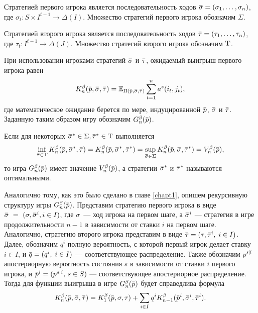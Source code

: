 {Стратегией первого игрока является последовательность ходов $\sigmav = (\sigma_1, \ldots, \sigma_n)$, где $\sigma_t: S \times I^{t-1} \rightarrow \Delta(I)$.
Множество стратегий первого игрока обозначим $\Sigma$.

Стратегией второго игрока является последовательность ходов $\tauv = (\tau_1, \ldots, \tau_n)$, где $\tau_t: I^{t-1} \rightarrow \Delta(J)$.
Множество стратегий второго игрока обозначим $\mathrm{T}$.

При использовании игроками стратегий $\sigmav$ и $\tauv$, ожидаемый выигрыш первого игрока равен
\begin{equation}
  \label{ch3:eq:Kn}
  \K(\p, \sigmav, \tauv) =
  \E_{\Pi(\p, \sigmav, \tauv)} \sum_{t=1}^n a^s(i_t, j_t),
\end{equation}
где математическое ожидание берется по мере, индуцированной $\p$, $\sigmav$ и $\tauv$.
Заданную таким образом игру обозначим $\theG(\p)$.

Если для некоторых $\sigmav^* \in \Sigma, \tauv^* \in \Tau$ выполняется
\begin{equation*}
  \inf_{\tauv \in \Tau} \K(\p, \sigmav^*, \tauv) =
  \K(\p, \sigmav^*, \tauv^*) =
  \sup_{\sigmav \in \Sigma} \K(\p, \sigmav, \tauv^*) = 
  \V(\p),
\end{equation*}
то игра $\theG(\p)$ имеет значение $\V(\p)$, а стратегии $\sigmav^*$ и $\tauv^*$
называются оптимальными.

Аналогично тому, как это было сделано в главе \ref{chapt1}, опишем рекурсивную структуру игры $\theG(\p)$.
Представим стратегию первого игрока в виде $\sigmav~=~(\sigma, \sigmav^i, i \in I)$,
где $\sigma$~--- ход игрока на первом шаге, а $\sigmav^i$ --- стратегия в игре
продолжительности $n-1$ в зависимости от ставки $i$ на первом шаге.
Аналогично, стратегию второго игрока представим в виде $\tauv = (\tau, \tauv^i, \; i \in I)$.
%
Далее, обозначим $q^i$ полную вероятность, с которой первый игрок делает ставку $i \in I$, и $\q = (q^i, \; i \in I)$ --- соответствующее распределение.
Также обозначим $p^{s|i}$ апостериорную вероятность состояния $s$ в зависимости от ставки $i$ первого игрока, и $\p^i = (p^{s|i}, \, s \in S)$ --- соответствующее апостериорное распределение.
Тогда для функции выигрыша в игре $\theG[n](\p)$ будет справедлива формула
\begin{equation}
  \label{problem:eq:Kn-recurrence}
  \K[n](\p, \sigmav, \tauv) =
  \K[1](\p, \sigma, \tau) +
  \sum_{i \in I} q^i \K[n-1](\p^i, \sigmav^i, \tauv^i).
\end{equation}

}
